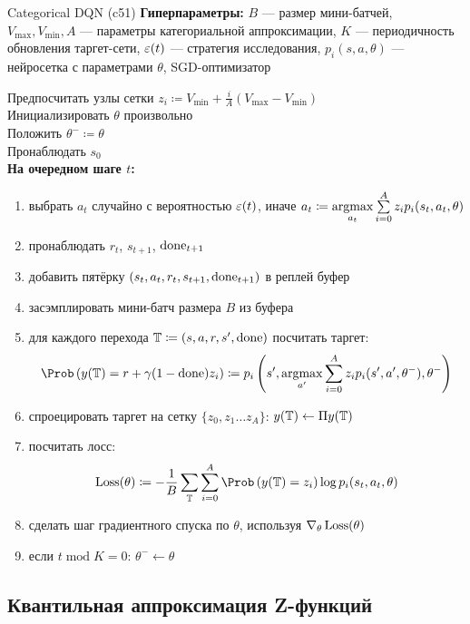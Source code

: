 \begin{algorithm}[label = c51algorithm]{Categorical DQN (c51)}
\textbf{Гиперпараметры:} $B$ --- размер мини-батчей, $V_{\max}, V_{\min}, A$ --- параметры категориальной аппроксимации, $K$ --- периодичность обновления таргет-сети, $\varepsilon(t)$ --- стратегия исследования, $p_i(s, a, \theta)$ --- нейросетка с параметрами $\theta$, SGD-оптимизатор

\vspace{0.3cm}
Предпосчитать узлы сетки $z_i \coloneqq V_{\min} + \frac{i}{A}(V_{\max} - V_{\min})$ \\
Инициализировать $\theta$ произвольно \\
Положить $\theta^- \coloneqq \theta$ \\
Пронаблюдать $s_0$ \\
\textbf{На очередном шаге $t$:}
\begin{enumerate}
    \item выбрать $a_t$ случайно с вероятностью $\varepsilon(t)$, иначе $a_t \coloneqq \mathop{\mathrm{argmax}}\limits_{a_t} \sum\limits_{i=0}^A z_i p_i(s_t, a_t, \theta)$
    \item пронаблюдать $r_t$,  $s_{t+1}$, $\mathrm{done}_{t+1}$
    \item добавить пятёрку $(s_t, a_t, r_t, s_{t+1}, \mathrm{done}_{t+1})$ в реплей буфер
    \item засэмплировать мини-батч размера $B$ из буфера
    \item для каждого перехода $\mathbb{T} \coloneqq (s, a, r, s', \mathrm{done})$ посчитать таргет:
    $$\Prob \left( y(\T) = r + \gamma (1 - \done) z_i \right) \coloneqq p_i\left( s', \argmax_{a'} \sum_{i=0}^A z_i p_i(s', a', \theta^-), \theta^- \right) $$
    \item спроецировать таргет на сетку $\{ z_0, z_1 \dots z_{A} \}$: $y(\mathbb{T}) \leftarrow \Pi y(\mathbb{T})$ 
    \item посчитать лосс:
    $$\Loss(\theta) \coloneqq -\frac{1}{B}\sum_{\T} \sum_{i=0}^{A} \Prob \left( y(\T) = z_i \right) \log p_i(s_t, a_t, \theta) $$
    \item сделать шаг градиентного спуска по $\theta$, используя $\nabla_\theta \operatorname{Loss}(\theta)$
    \item если $t \operatorname{mod} K = 0$: $\theta^- \gets \theta$
\end{enumerate}
\end{algorithm}

\subsection{Квантильная аппроксимация Z-функций}

